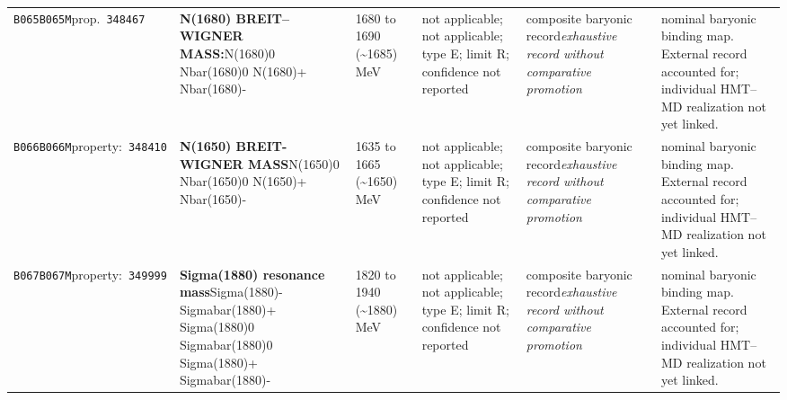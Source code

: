 \begin{landscape}
\begin{longtable}{L{1.85cm}L{4.45cm}L{2.35cm}L{4.05cm}L{3.35cm}L{7.15cm}}
\texttt{B065}\newline \texttt{B065M}\newline prop.\ \texttt{348467} & \textbf{N(1680) BREIT--WIGNER MASS:}\newline N(1680)0 \textbar{}\allowbreak{} Nbar(1680)0 \textbar{}\allowbreak{} N(1680)+ \textbar{}\allowbreak{} Nbar(1680)- & 1680 to 1690 (\textasciitilde{}1685)\,MeV & not applicable; not applicable; type E; limit R; confidence not reported & composite baryonic record\newline \emph{exhaustive record without comparative promotion} & nominal baryonic binding map. External record accounted for; individual HMT--MD realization not yet linked. \\
\texttt{B066}\newline \texttt{B066M}\newline property:\ \texttt{348410} & \textbf{N(1650) BREIT-WIGNER MASS}\newline N(1650)0 \textbar{}\allowbreak{} Nbar(1650)0 \textbar{}\allowbreak{} N(1650)+ \textbar{}\allowbreak{} Nbar(1650)- & 1635 to 1665 (\textasciitilde{}1650)\,MeV & not applicable; not applicable; type E; limit R; confidence not reported & composite baryonic record\newline \emph{exhaustive record without comparative promotion} & nominal baryonic binding map. External record accounted for; individual HMT--MD realization not yet linked. \\
\texttt{B067}\newline \texttt{B067M}\newline property:\ \texttt{349999} & \textbf{Sigma(1880) resonance mass}\newline Sigma(1880)- \textbar{}\allowbreak{} Sigmabar(1880)+ \textbar{}\allowbreak{} Sigma(1880)0 \textbar{}\allowbreak{} Sigmabar(1880)0 \textbar{}\allowbreak{} Sigma(1880)+ \textbar{}\allowbreak{} Sigmabar(1880)- & 1820 to 1940 (\textasciitilde{}1880)\,MeV & not applicable; not applicable; type E; limit R; confidence not reported & composite baryonic record\newline \emph{exhaustive record without comparative promotion} & nominal baryonic binding map. External record accounted for; individual HMT--MD realization not yet linked. \\

\end{longtable}
\end{landscape}
